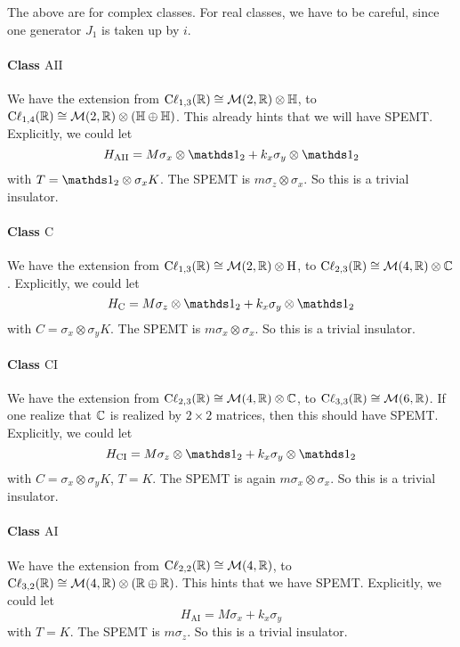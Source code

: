 \documentclass{article}
\begin{document}
The above are for complex classes. For real classes, we have to be careful,
since one generator $J_1$ is taken up by $i$.

\paragraph{Class $\mathrm{AII}$} We have the extension from
$\mathrm{C\ell}_{1,3}(\mathbb{R})\cong\mathcal{M}(2,\mathbb{R})\otimes\mathbb{H}$, to
$\mathrm{C\ell}_{1,4}(\mathbb{R})\cong\mathcal{M}(2,\mathbb{R})\otimes(\mathbb{H}\oplus\mathbb{H})$.
This already hints that we will have SPEMT. Explicitly, we could let
\begin{equation}
    H_{\mathrm{AII}} = M\sigma_x\otimes\id_2 + k_x\sigma_y\otimes\id_2
\end{equation}
with $T=\id_2\otimes\sigma_x K$. The SPEMT is $m\sigma_z\otimes\sigma_x$. So
this is a trivial insulator.

\paragraph{Class $\mathrm{C}$} We have the extension from
$\mathrm{C\ell}_{1,3}(\mathbb{R})\cong\mathcal{M}(2,\mathbb{R})\otimes\mathrm{H}$, to
$\mathrm{C\ell}_{2,3}(\mathbb{R})\cong\mathcal{M}(4,\mathbb{R})\otimes\mathbb{C}$. Explicitly, we
could let
\begin{equation}
    H_{\mathrm{C}} = M\sigma_z\otimes\id_2 + k_x\sigma_y\otimes\id_2
\end{equation}
with $C=\sigma_x\otimes\sigma_y K$. The SPEMT is $m\sigma_x\otimes\sigma_x$. So
this is a trivial insulator.

\paragraph{Class $\mathrm{CI}$} We have the extension from
$\mathrm{C\ell}_{2,3}(\mathbb{R})\cong\mathcal{M}(4,\mathbb{R})\otimes\mathbb{C}$, to
$\mathrm{C\ell}_{3,3}(\mathbb{R})\cong\mathcal{M}(6,\mathbb{R})$. If one realize that $\mathbb{C}$ is
realized by $2\times 2$ matrices, then this should have SPEMT. Explicitly, we
could let
\begin{equation}
    H_{\mathrm{CI}} = M\sigma_z\otimes\id_2 + k_x\sigma_y\otimes\id_2
\end{equation}
with $C=\sigma_x\otimes\sigma_y K$, $T=K$. The SPEMT is again
$m\sigma_x\otimes\sigma_x$. So this is a trivial insulator.

\paragraph{Class $\mathrm{AI}$} We have the extension from
$\mathrm{C\ell}_{2,2}(\mathbb{R})\cong\mathcal{M}(4,\mathbb{R})$, to
$\mathrm{C\ell}_{3,2}(\mathbb{R})\cong\mathcal{M}(4,\mathbb{R})\otimes(\mathbb{R}\oplus\mathbb{R})$. This hints
that we have SPEMT. Explicitly, we could let
\begin{equation}
    H_{\mathrm{AI}} = M\sigma_x + k_x\sigma_y
\end{equation}
with $T=K$. The SPEMT is $m\sigma_z$. So this is a trivial insulator.
\end{document}
